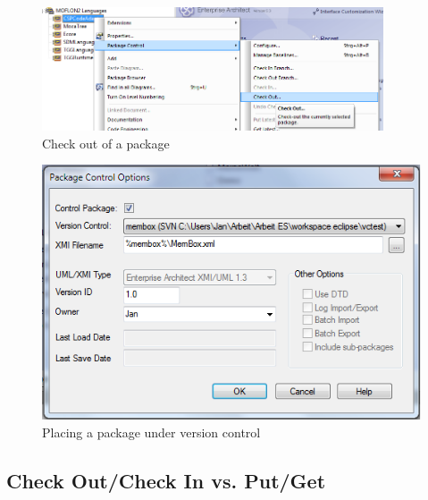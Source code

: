 \begin{enumerate}
\begin{figure}[htbp]
\begin{center}
	\includegraphics[width=0.9\textwidth]{pics/advancedTopics/eaSVN/checkout.png}
	\caption{Check out of a package}
  	\label{fig:advanced-topics-eaSVN-checkout}
\end{center}
\end{figure}
\begin{figure}[htbp]
\begin{center} 
	\includegraphics[scale=0.65]{pics/advancedTopics/eaSVN/cont.png}
	\caption{Placing a package under version control}
  	\label{fig:advanced-topics-eaSVN-addPackage}
\end{center}
\end{figure}

\end{enumerate}
 
\subsection{Check Out/Check In vs. Put/Get}
\label{sect:appendixB_update_commit}

